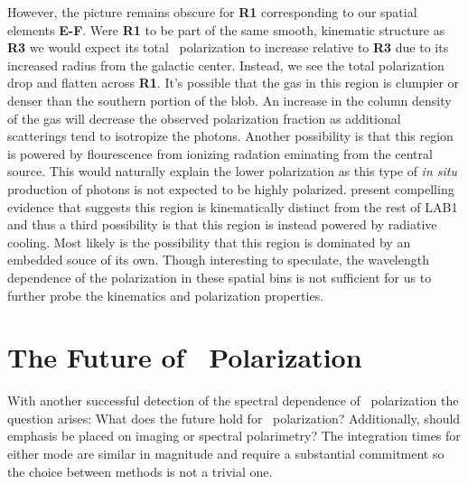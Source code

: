 However, the picture remains obscure for \textbf{R1} corresponding to our spatial elements \textbf{E-F}. Were \textbf{R1} to be part of the same smooth, kinematic structure as \textbf{R3} we would expect its total \lya~polarization to increase relative to \textbf{R3} due to its increased radius from the galactic center. Instead, we see the total polarization drop and flatten across \textbf{R1}. It's possible that the gas in this region is clumpier or denser than the southern portion of the blob. An increase in the column density of the gas will decrease the observed polarization fraction as additional scatterings tend to isotropize the photons. Another possibility is that this region is powered by flourescence from ionizing radation eminating from the central source. This would naturally explain the lower polarization as this type of \textit{in situ} production of photons is not expected to be highly polarized.   \cite{Weijmans2010} present compelling evidence that suggests this region is kinematically distinct from the rest of LAB1 and thus a third possibility is that this region is instead powered by radiative cooling. Most likely is the possibility that this region is dominated by an embedded souce of its own. Though interesting to speculate, the wavelength dependence of the polarization in these spatial bins is not sufficient for us to further probe the kinematics and polarization properties. 



\section{The Future of \lya~Polarization}\label{sec: future}
With another successful detection of the spectral dependence of \lya~polarization the question arises: What does the future hold for \lya~polarization? Additionally, should emphasis be placed on imaging or spectral polarimetry? The integration times for either mode are similar in magnitude and require a substantial commitment so the choice between methods is not a trivial one.  

